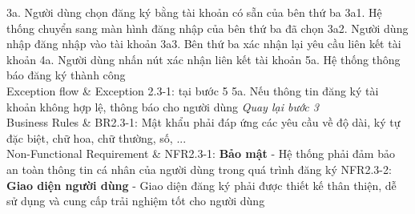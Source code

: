 \begin{usecase_table}
                        3a. Người dùng chọn đăng ký bằng tài khoản có sẵn của bên thứ ba \newline
                        3a1. Hệ thống chuyển sang màn hình đăng nhập của bên thứ ba đã chọn \newline
                        3a2. Người dùng nhập đăng nhập vào tài khoản \newline
                        3a3. Bên thứ ba xác nhận lại yêu cầu liên kết tài khoản \newline
                        4a. Người dùng nhấn nút xác nhận liên kết tài khoản \newline
                        5a. Hệ thống thông báo đăng ký thành công \\
                    \hline
                    Exception flow & 	
                        Exception 2.3-1: tại bước 5 \newline
                        5a. Nếu thông tin đăng ký tài khoản không hợp lệ, thông báo cho người dùng \newline
                        \textit{Quay lại bước 3} \\
                    \hline
                    Business Rules	& 
                        BR2.3-1: Mật khẩu phải đáp ứng các yêu cầu về độ dài, ký tự đặc biệt, chữ hoa, chữ thường, số, ...  \\
                    \hline
                    Non-Functional Requirement & 
                        NFR2.3-1: \textbf{Bảo mật} - Hệ thống phải đảm bảo an toàn thông tin cá nhân của người dùng trong quá trình đăng ký \newline
                        NFR2.3-2: \textbf{Giao diện người dùng} - Giao diện đăng ký phải được thiết kế thân thiện, dễ sử dụng và cung cấp trải nghiệm tốt cho người dùng
                    \\
                    \hline
                \end{usecase_table}
